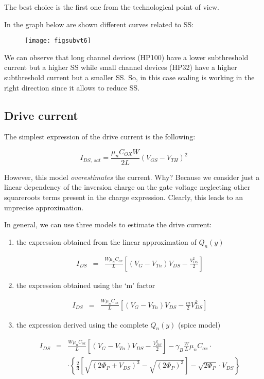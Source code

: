 \documentclass[a4paper, 12pt, twoside, openright]{report}
\begin{document}
The best choice is the first one from the technological point of view.

In the graph below are shown different curves related to SS:



	\begin{figure}[H]
	\centering
	\texttt{[image: figsubvt6]}
	\caption{}
	\label{}
	\end{figure}

We can observe that long channel devices (HP100) have a lower subthreshold current but a higher SS while small channel devices (HP32) have a higher subthreshold current but a smaller SS. So, in this case scaling is working in the right direction since it allows to reduce SS.

\subsection{Drive current}

The simplest expression of the drive current is the following:

\begin{equation}
I_{DS,\ sat} = \frac{\mu_n C_{OX} W}{2L} (V_{GS} - V_{TH})^2
\label{}
\end{equation}

However, this model \emph{overestimates} the current. Why? Because we consider just a linear dependency of the inversion charge on the gate voltage neglecting other squareroots terms present in the charge expression. Clearly, this leads to an unprecise approximation.

In general, we can use three models to estimate the drive current:
\begin{enumerate}
\item the expression obtained from the linear approximation of $Q_{n}(y)$

	\begin{eqnarray*}
	 I_{DS} &=&\frac{W \mu_n C_{ox}}{L}\left[\left(V_G-V_{Tn}\right)V_{DS}-\frac{V_{DS}^2}{2}\right]
	\end{eqnarray*}

\item the expression obtained using the `m' factor

	\begin{eqnarray*}
	 I_{DS} &=&\frac{W \mu_n C_{ox}}{L}\left[\left(V_G-V_{Tn}\right)V_{DS}-\frac{ {m}}{2}V_{DS}^2\right]
	\end{eqnarray*}

\item the expression derived using the complete $Q_{n}(y)$ (spice model)

	\begin{eqnarray*}
	I_{DS} &=&\frac{W \mu_n C_{ox}}{L}\left[\left(V_G-V_{Tn}\right)V_{DS}-\frac{V_{DS}^2}{2}\right]
	        -\gamma_B \frac{W}{L}\mu_n C_{ox}\cdot\\
	        & &\cdot\left\{\frac{2}{3}\left[\sqrt{\left(2\Phi_P +V_{DS}\right)^3}
	            -\sqrt{\left(2\Phi_P\right)^3}\right]-\sqrt{2\Phi_P}\cdot V_{DS}\right\}
	\end{eqnarray*}

\end{enumerate}
\end{document}
